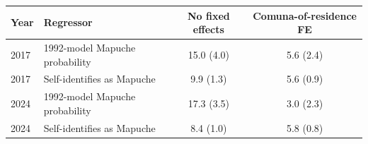 \begin{tabular}{llcc}
\toprule
Year & Regressor & No fixed effects & Comuna-of-residence FE \\
\midrule
2017 & 1992-model Mapuche probability & 15.0 (4.0) & 5.6 (2.4) \\
2017 & Self-identifies as Mapuche & 9.9 (1.3) & 5.6 (0.9) \\
2024 & 1992-model Mapuche probability & 17.3 (3.5) & 3.0 (2.3) \\
2024 & Self-identifies as Mapuche & 8.4 (1.0) & 5.8 (0.8) \\
\bottomrule
\end{tabular}
